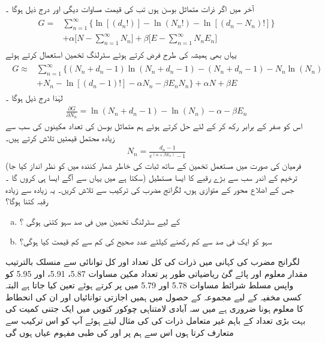 آخر میں اگر ذرات  متماثل بوسن ہوں تب  کی قیمت مساوات  دیگی اور درج ذیل ہوگا ۔
\begin{gather}
\begin{aligned}
G =& \sum_{n = 1}^{\infty} \{ \ln[(d_n !) ] - \ln(N_n !) - \ln[(d_n - N_n) ! ] \} \\
&+ \alpha \big [ N - \sum_{n = 1}^{\infty} N_n \big ] + \beta \big [ E - \sum_{n = 1}^{\infty} N_n E_n \big ]
\end{aligned}
\end{gather}
یہاں بھی ہمیشہ کی طرح  فرض کرتے ہوئے سٹرلنگ تخمین استعمال کرتے ہوئے 
\begin{gather}
\begin{aligned}
G \approx &\sum_{n = 1}^{\infty} \{ (N_n + d_n - 1) \ln(N_n + d_n - 1) - (N_n + d_n - 1) - N_n \ln(N_n) \\
&+ N_n - \ln[(d_n - 1) !] - \alpha N_n - \beta E_n N_n \} + \alpha N + \beta E
\end{aligned}
\end{gather}
لہٰذا درج ذیل ہوگا ۔
\begin{align}
\frac{\partial G}{\partial N_n} = \ln(N_n + d_n - 1) - \ln(N_n) - \alpha - \beta E_n
\end{align}
اس کو صفر کے برابر رکھ کر  کے لئے حل کرتے ہوئے ہم متماثل بوسن کی تعداد مکینوں کی سب  سے زیادہ محتمل قیمتیں  تلاش کرتے ہیں۔ 
\begin{align}
N_n = \frac{d_n - 1}{e^{(\alpha + \beta E_n)} - 1}
\end{align}
(فرمیان کی صورت میں مستعمل  تخمین کے ساتھ ثبات کی خاطر  شمار کنندہ میں  کو نظر انداز کیا جا سکتا ہے میں یہاں سے آگے ایسا ہی کروں گا ۔)
ترخیم  کے اندر  سب سے بڑے  رقبے کا ایسا مستطیل جس کے اضلاع محور کے متوازی ہوں،  لگرانج مضرب کی ترکیب سے تلاش کریں۔  یہ  زیادہ سے زیادہ رقبہ کتنا  ہوگا؟ 
\begin{enumerate}[a.]
\item
{} کے لیے سٹرلنگ تخمین میں فی صد  سہو  کتنی  ہوگی ؟
\item
سہو  کو ایک فی صد سے کم رکھنے کیلئے عدد صحیح  کی کم سے کم قیمت کیا ہوگی؟ 
\end{enumerate}


لگرانج مضرب کی کہانی میں ذرات کی کل تعداد اور کل توانائی سے منسلک بالترتیب مقدار معلوم  اور  پائے گئ ریاضیاتی طور پر تعداد مکین مساوات 5.87، 5.91، اور 5.95 کو واپس مسلط شرائط مساوات 5.78 اور 5.79 میں پر کرتے ہوئے تعین کیا جاتا ہے البتہ کسی مخفیہ  کے لیے مجموعہ کے حصول میں ہمیں اجازتی توانائیاں    اور ان کی انحطاط  کا معلوم ہونا ضروری ہے میں سہ آبادی لامتناہی چوکور کنویں  میں ایک جتنی کمیت کی بہت بڑی تعداد کے باہم غیر متعامل ذرات کی    کی مثال لیتے ہوئے آپ کو اس ترکیب سے متعارف کرتا ہوں اس سے ہم پر  اور  کی طبی مفہوم عیاں ہوں گی 


